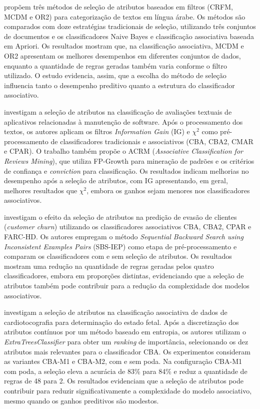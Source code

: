  propõem três métodos de seleção de atributos baseados em filtros (CRFM, MCDM e OR2) para categorização de textos em língua árabe. Os métodos são comparados com doze estratégias tradicionais de seleção, utilizando três conjuntos de documentos e os classificadores Naive Bayes e classificação associativa baseada em Apriori. Os resultados mostram que, na classificação associativa, MCDM e OR2 apresentam os melhores desempenhos em diferentes conjuntos de dados, enquanto a quantidade de regras geradas também varia conforme o filtro utilizado. O estudo evidencia, assim, que a escolha do método de seleção influencia tanto o desempenho preditivo quanto a estrutura do classificador associativo.

 investigam a seleção de atributos na classificação de avaliações textuais de aplicativos relacionadas à manutenção de software. Após o processamento dos textos, os autores aplicam os filtros \textit{Information Gain} (IG) e $\chi^2$ como pré-processamento de classificadores tradicionais e associativos (CBA, CBA2, CMAR e CPAR). O trabalho também propõe o ACRM (\textit{Associative Classification for Reviews Mining}), que utiliza FP-Growth para mineração de padrões e os critérios de confiança e \textit{conviction} para classificação. Os resultados indicam melhorias no desempenho após a seleção de atributos, com IG apresentando, em geral, melhores resultados que $\chi^2$, embora os ganhos sejam menores nos classificadores associativos.

 investigam o efeito da seleção de atributos na predição de evasão de clientes (\textit{customer churn}) utilizando os classificadores associativos CBA, CBA2, CPAR e FARC-HD. Os autores empregam o método \textit{Sequential Backward Search using Inconsistent Examples Pairs} (SBS-IEP) como etapa de pré-processamento e comparam os classificadores com e sem seleção de atributos. Os resultados mostram uma redução na quantidade de regras geradas pelos quatro classificadores, embora em proporções distintas, evidenciando que a seleção de atributos também pode contribuir para a redução da complexidade dos modelos associativos.

 investigam a seleção de atributos na classificação associativa de dados de cardiotocografia para determinação do estado fetal. Após a discretização dos atributos contínuos por um método baseado em entropia, os autores utilizam o \textit{ExtraTreesClassifier} para obter um \textit{ranking} de importância, selecionando os dez atributos mais relevantes para o classificador CBA. Os experimentos consideram as variantes CBA-M1 e CBA-M2, com e sem poda. Na configuração CBA-M1 com poda, a seleção eleva a acurácia de 83\% para 84\% e reduz a quantidade de regras de 48 para 2. Os resultados evidenciam que a seleção de atributos pode contribuir para reduzir significativamente a complexidade do modelo associativo, mesmo quando os ganhos preditivos são modestos.

